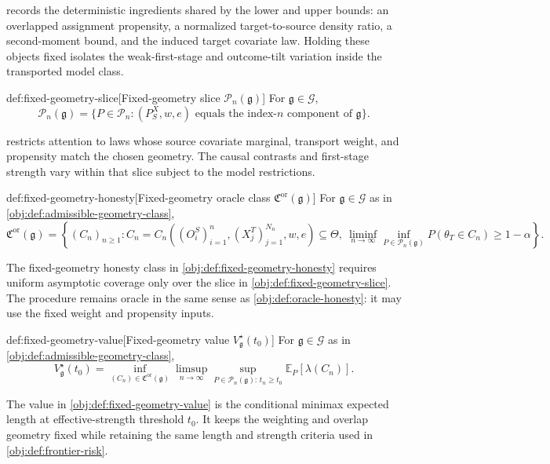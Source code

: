 \documentclass[11pt]{article}
\begin{document}
 records the deterministic ingredients shared by the lower and upper bounds: an overlapped assignment propensity, a normalized target-to-source density ratio, a second-moment bound, and the induced target covariate law. Holding these objects fixed isolates the weak-first-stage and outcome-tilt variation inside the transported model class.

\begin{definitionv}{def:fixed-geometry-slice}[Fixed-geometry slice \(\mathcal P_n(\mathfrak g)\)]
For \(\mathfrak g\in\mathcal G\),
\[
\mathcal P_n(\mathfrak g)
=
\{P\in\mathcal P_n:(P_S^X,w,e)\text{ equals the index-}n\text{ component of }\mathfrak g\}.
\]
\end{definitionv}

 restricts attention to laws whose source covariate marginal, transport weight, and propensity match the chosen geometry. The causal contrasts and first-stage strength vary within that slice subject to the model restrictions.

\begin{definitionv}{def:fixed-geometry-honesty}[Fixed-geometry oracle class \(\mathfrak C^{\mathrm{or}}(\mathfrak g)\)]
For \(\mathfrak g\in\mathcal G\) as in \cref{obj:def:admissible-geometry-class},
\[
\mathfrak C^{\mathrm{or}}(\mathfrak g)
=
\left\{
(C_n)_{n\ge1}:
C_n=C_n\!\left((O_i^S)_{i=1}^n,(X_j^T)_{j=1}^{N_n},w,e\right)\subseteq\Theta,\ 
\liminf_{n\to\infty}\inf_{P\in\mathcal P_n(\mathfrak g)}
P(\theta_T\in C_n)\ge1-\alpha
\right\}.
\]
\end{definitionv}

The fixed-geometry honesty class in \cref{obj:def:fixed-geometry-honesty} requires uniform asymptotic coverage only over the slice in \cref{obj:def:fixed-geometry-slice}. The procedure remains oracle in the same sense as \cref{obj:def:oracle-honesty}: it may use the fixed weight and propensity inputs.

\begin{definitionv}{def:fixed-geometry-value}[Fixed-geometry value \(V_{\mathfrak g}^\star(t_0)\)]
For \(\mathfrak g\in\mathcal G\) as in \cref{obj:def:admissible-geometry-class},
\[
V_{\mathfrak g}^\star(t_0)
=
\inf_{(C_n)\in\mathfrak C^{\mathrm{or}}(\mathfrak g)}
\limsup_{n\to\infty}
\sup_{P\in\mathcal P_n(\mathfrak g):\,t_n\ge t_0}
\mathbb E_P[\lambda(C_n)].
\]
\end{definitionv}

The value in \cref{obj:def:fixed-geometry-value} is the conditional minimax expected length at effective-strength threshold \(t_0\). It keeps the weighting and overlap geometry fixed while retaining the same length and strength criteria used in \cref{obj:def:frontier-risk}.
\end{document}
